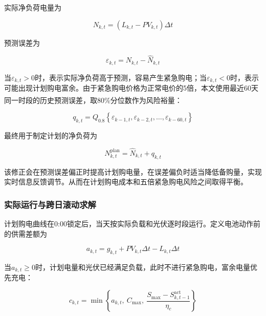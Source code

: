 \documentclass[UTF8]{ctexart}
\let\oldcite\cite
\renewcommand{\cite}[1]{\textsuperscript{\oldcite{#1}}}
\begin{document}
    实际净负荷电量为
    
    \begin{equation}
        N_{k,t}
        =\left(L_{k,t}-PV_{k,t}\right)\Delta t
    \end{equation}
    
    预测误差为
    
    \begin{equation}
        \varepsilon_{k,t}
        =N_{k,t}-\widehat N_{k,t}
    \end{equation}
    
    当$\varepsilon_{k,t}>0$时，表示实际净负荷高于预测，容易产生紧急购电；当$\varepsilon_{k,t}<0$时，表示可能出现计划购电富余。由于紧急购电价格为正常电价的5倍，本文使用最近60天同一时段的历史预测误差，取80\%分位数作为风险裕量\cite{GNEITING2011197}：
    
    \begin{equation}
        q_{k,t}
        =Q_{0.8}
        \left\{
        \varepsilon_{k-1,t},
        \varepsilon_{k-2,t},
        \ldots,
        \varepsilon_{k-60,t}
        \right\}
    \end{equation}
    
    最终用于制定计划的净负荷为
    
    \begin{equation}
        N^{\mathrm{plan}}_{k,t}
        =\widehat N_{k,t}+q_{k,t}
    \end{equation}
    
    该修正会在预测误差偏正时提高计划购电量，在误差偏负时适当降低备购量，实现实时信息反馈调节。从而在计划购电成本和五倍紧急购电风险之间取得平衡。\par
    
    \subsubsection{实际运行与跨日滚动求解}
    
    计划购电曲线在0:00锁定后，当天按实际负载和光伏逐时段运行。定义电池动作前的供需差额为
    
    \begin{equation}
        a_{k,t}
        =g_{k,t}+PV_{k,t}\Delta t-L_{k,t}\Delta t
    \end{equation}
    
    当$a_{k,t}\geq0$时，计划电量和光伏已经满足负载，此时不进行紧急购电，富余电量优先充电：
    
    \begin{equation}
        c_{k,t}
        =\min\left\{
        a_{k,t},\ 
        C_{\max},\ 
        \frac{S_{\max}-S_{k,t-1}^{\mathrm{act}}}{\eta_c}
        \right\}
    \end{equation}
    
\end{document}
